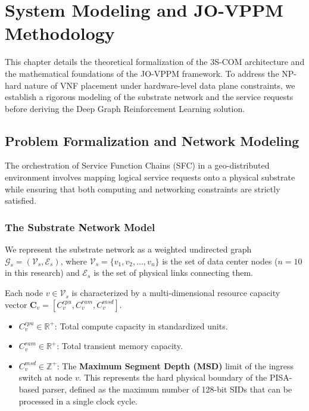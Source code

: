 \chapter{System Modeling and JO-VPPM Methodology}
\label{chap:method}

This chapter details the theoretical formalization of the 3S-COM architecture and the mathematical foundations of the JO-VPPM framework. To address the NP-hard nature of VNF placement under hardware-level data plane constraints, we establish a rigorous modeling of the substrate network and the service requests before deriving the Deep Graph Reinforcement Learning solution.

\section{Problem Formalization and Network Modeling}
\label{sec:math_modeling}
The orchestration of Service Function Chains (SFC) in a geo-distributed environment involves mapping logical service requests onto a physical substrate while ensuring that both computing and networking constraints are strictly satisfied.

\subsection{The Substrate Network Model}
We represent the substrate network as a weighted undirected graph $\mathcal{G}_s = (\mathcal{V}_s, \mathcal{E}_s)$, where $\mathcal{V}_s = \{v_1, v_2, \dots, v_n\}$ is the set of data center nodes ($n=10$ in this research) and $\mathcal{E}_s$ is the set of physical links connecting them. 

Each node $v \in \mathcal{V}_s$ is characterized by a multi-dimensional resource capacity vector $\mathbf{C}_v = [C_v^{cpu}, C_v^{ram}, C_v^{msd}]$. 
\begin{itemize}
    \item $C_v^{cpu} \in \mathbb{R}^+$: Total compute capacity in standardized units.
    \item $C_v^{ram} \in \mathbb{R}^+$: Total transient memory capacity.
    \item $C_v^{msd} \in \mathbb{Z}^+$: The \textbf{Maximum Segment Depth (MSD)} limit of the ingress switch at node $v$. This represents the hard physical boundary of the PISA-based parser, defined as the maximum number of 128-bit SIDs that can be processed in a single clock cycle.
\end{itemize}

